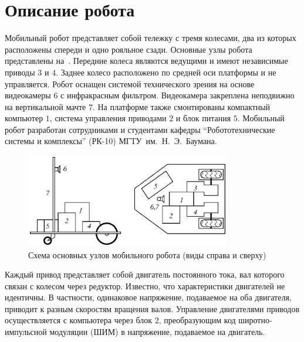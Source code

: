 
\label{mobile-robot}

\section{Описание робота}

Мобильный робот представляет собой тележку с тремя колесами, два из
которых расположены спереди и одно рояльное сзади.  Основные узлы
робота представлены на~.  Передние колеса
являются ведущими и имеют независимые приводы $3$ и $4$.  Заднее
колесо расположено по средней оси платформы и не управляется.  Робот
оснащен системой технического зрения на основе видеокамеры $6$ с
инфракрасным фильтром.  Видеокамера закреплена неподвижно на
вертикальной мачте $7$.  На платформе также смонтированы компактный
компьютер $1$, система управления приводами $2$ и блок питания $5$.
Мобильный робот разработан сотрудниками и студентами кафедры
``Робототехнические системы и комплексы'' (РК-10)
МГТУ~им.~Н.~Э.~Баумана.

\begin{figure}[h]
\centerline{\includegraphics[width=0.8\textwidth]{moby_projections}}
\caption{Схема основных узлов мобильного робота (виды справа и сверху)}%
\label{fig:moby_projections}
\end{figure}

Каждый привод представляет собой двигатель постоянного тока, вал
которого связан с колесом через редуктор.  Известно, что
характеристики двигателей не идентичны.  В частности, одинаковое
напряжение, подаваемое на оба двигателя, приводит к разным скоростям
вращения валов.  Управление двигателями приводов осуществляется с
компьютера через блок $2$, преобразующим код широтно-импульсной
модуляции (ШИМ) в напряжение, подаваемое на двигатель.

